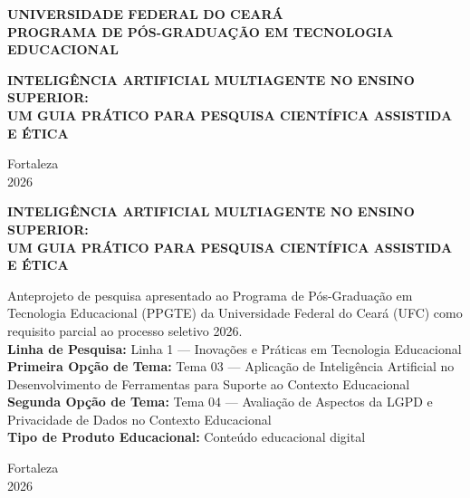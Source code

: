 \documentclass[
    12pt,
    openany,
    oneside,
    a4paper,
    brazilian
]{abntex2}
\newcommand{\linhapesquisa}{Linha 1 --- Inovações e Práticas em Tecnologia Educacional}
\newcommand{\temaum}{Tema 03 --- Aplicação de Inteligência Artificial no Desenvolvimento de Ferramentas para Suporte ao Contexto Educacional}
\newcommand{\temadois}{Tema 04 --- Avaliação de Aspectos da LGPD e Privacidade de Dados no Contexto Educacional}
\newcommand{\tipoproduto}{Conteúdo educacional digital}
\begin{document}
\ifx\autor\empty
    \begin{titlepage}
        \thispagestyle{empty}
        \begin{center}
            \vspace*{4cm}
            {\ABNTEXchapterfont\bfseries\large UNIVERSIDADE FEDERAL DO CEARÁ\\[0.3cm]
            PROGRAMA DE PÓS-GRADUAÇÃO EM TECNOLOGIA EDUCACIONAL}
            
            \vspace{4cm}
            
            {\ABNTEXchapterfont\bfseries\LARGE INTELIGÊNCIA ARTIFICIAL MULTIAGENTE NO ENSINO SUPERIOR:\\[0.5cm]
            UM GUIA PRÁTICO PARA PESQUISA CIENTÍFICA ASSISTIDA E ÉTICA}
            
            \vfill
            
            {\large Fortaleza\\2026}
        \end{center}
    \end{titlepage}
\else
    \imprimircapa
\fi

\begin{folhaderosto}
    \begin{center}
        \vspace*{3cm}
        {\ABNTEXchapterfont\bfseries\LARGE INTELIGÊNCIA ARTIFICIAL MULTIAGENTE NO ENSINO SUPERIOR:\\[0.5cm]
        UM GUIA PRÁTICO PARA PESQUISA CIENTÍFICA ASSISTIDA E ÉTICA}
        
        \vspace{2cm}
        
        \hfill\begin{minipage}{0.5\textwidth}
        \small
        Anteprojeto de pesquisa apresentado ao Programa de Pós-Graduação em Tecnologia Educacional (PPGTE) da Universidade Federal do Ceará (UFC) como requisito parcial ao processo seletivo 2026.\\[1cm]
        \textbf{Linha de Pesquisa:} \linhapesquisa\\[0.3cm]
        \textbf{Primeira Opção de Tema:} \temaum\\[0.3cm]
        \textbf{Segunda Opção de Tema:} \temadois\\[0.3cm]
        \textbf{Tipo de Produto Educacional:} \tipoproduto
        \end{minipage}
        
        \vfill
        
        {\large Fortaleza\\2026}
    \end{center}
\end{folhaderosto}
\end{document}
